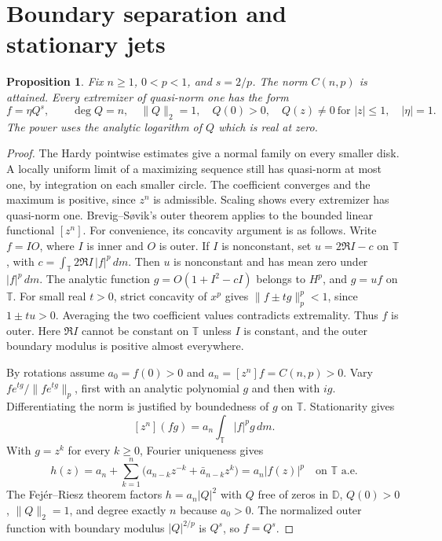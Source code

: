 \documentclass[11pt]{article}
\newtheorem{proposition}[theorem]{Proposition}
\newcommand{\D}{\mathbb D}
\newcommand{\T}{\mathbb T}
\newcommand{\coef}[1]{[z^{#1}]}
\begin{document}
\section{Boundary separation and stationary jets}





\begin{proposition}\label{prop:boundary}
Fix \(n\ge1\), \(0<p<1\), and \(s=2/p\). The norm \(C(n,p)\)
is attained. Every extremizer of quasi-norm one has the form
\[
 f=\eta Q^s,\qquad
 \deg Q=n,\quad \|Q\|_2=1,\quad Q(0)>0,\quad
 Q(z)\ne0\ \text{for }|z|\le1,\quad |\eta|=1 .
\]
The power uses the analytic logarithm of \(Q\) which is real at zero.
\end{proposition}

\begin{proof}
The Hardy pointwise estimates give a normal family on every smaller
disk. A locally uniform limit of a maximizing sequence still has
quasi-norm at most one, by integration on each smaller circle.
The coefficient converges and the maximum is positive, since \(z^n\)
is admissible. Scaling shows every extremizer has quasi-norm one.
Brevig--S{\o}vik's outer theorem \cite[Thm.~1]{BrevigSovik} applies
to the bounded linear functional \(\coef n\). For convenience, its
concavity argument is as follows. Write \(f=IO\), where \(I\) is
inner and \(O\) is outer. If \(I\) is nonconstant, set
\(u=2\Re I-c\) on \(\T\), with
\(c=\int_{\T}2\Re I\,|f|^p\,dm\). Then \(u\) is nonconstant and has
mean zero under \(|f|^p\,dm\). The analytic function
\(g=O(1+I^2-cI)\) belongs to \(H^p\), and \(g=uf\) on \(\T\).
For small real \(t>0\), strict concavity of \(x^p\) gives
\(\|f\pm tg\|_p^p<1\), since \(1\pm tu>0\).
Averaging the two coefficient values contradicts extremality.
Thus \(f\) is outer. Here \(\Re I\) cannot be constant on \(\T\)
unless \(I\) is constant, and the outer boundary modulus is positive
almost everywhere.

By rotations assume \(a_0=f(0)>0\) and \(a_n=\coef n f=C(n,p)>0\).
Vary \(f e^{t g}/\|f e^{t g}\|_p\), first with an analytic polynomial
\(g\) and then with \(ig\). Differentiating the norm is justified
by boundedness of \(g\) on \(\T\). Stationarity gives
\[
 \coef n(fg)=a_n\int_{\T}|f|^p g\,dm .
\]
With \(g=z^k\) for every \(k\ge0\), Fourier uniqueness gives
\[
 h(z)=a_n+\sum_{k=1}^n
       \bigl(a_{n-k}z^{-k}+\bar a_{n-k}z^k\bigr)
     =a_n |f(z)|^p \quad\text{on }\T\text{ a.e.}
\]
The Fej\'er--Riesz theorem factors \(h=a_n |Q|^2\) with
\(Q\) free of zeros in \(\D\), \(Q(0)>0\), \(\|Q\|_2=1\), and
degree exactly \(n\) because \(a_0>0\). The normalized outer function
with boundary modulus \(|Q|^{2/p}\) is \(Q^s\), so \(f=Q^s\).


\end{proof}
\end{document}
